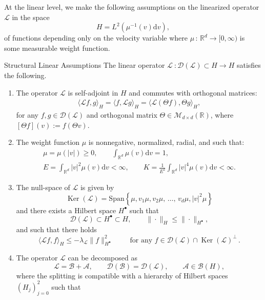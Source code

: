 \documentclass[10pt]{amsart}
\theoremstyle{definition}\newtheorem{defi}[theo]{Definition}\newtheorem{rema}[theo]{Remark}\newtheorem{exam}[theo]{Example}\newtheorem{exem}[theo]{Example}\newtheorem{nota}[theo]{Notation}
\DeclareMathOperator{\nul}{Ker}
\renewcommand{\d}{\mathrm{d}}
\newcommand{\rSpan}{\mathrm{Span}}
\newcommand{\R}{\mathbb{R}}
\renewcommand{\AA}{\mathcal{A}}
\newcommand{\BB}{\mathcal{B}}
\newcommand{\LL}{\mathcal{L}}
\newcommand{\dom}{\mathscr{D}}
\newcommand{\BBB}{\mathscr{B}}
\newcommand{\MMM}{\mathscr{M}}
\newcommand{\Ss}{H}
\newcommand{\Ssp}{H^{\bullet}}
\renewcommand*\le{\leqslant}
\renewcommand*\ge{\geqslant}
\newcommand{\la}{\langle}
\newcommand{\ra}{\rangle}
\newcommand*{\relabel}{\renewcommand{\labelenumi}{(\theenumi)}}
\newcommand*{\Lenumi}{\renewcommand*{\theenumi}{\textbf{L\arabic{enumi}}}\relabel}
\begin{document}
At the linear level, we make the following assumptions on the linearized operator $\LL$ in the space
\[
\Ss=L^{2}\left(\mu^{-1}(v)\d v\right),
\]
of functions depending only on the velocity variable where $\mu \, : \, \R^d \to [0,\infty)$ is some measurable weight function.

\begin{enonce}{Structural Linear Assumptions}\label{AsL1}
The linear operator $\LL\::\dom(\LL) \subset \Ss \to \Ss$ satisfies the following.
\begin{enumerate}\Lenumi
\item \label{L1}
The operator $\LL$ is self-adjoint in $\Ss$ and commutes with orthogonal matrices:
\begin{gather*}
\langle \LL f, g \rangle_{\Ss} = \langle f, \LL g \rangle_{\Ss} = \langle \LL ({\Theta}f), \Theta g \rangle_\Ss,
\end{gather*}
for any $f, g \in \dom(\LL)$ and orthogonal matrix $\Theta \in \MMM_{d \times d}(\R)$, where $[\Theta f](v):=f(\Theta v)$.
\item \label{L2}
The weight function $\mu$ is nonnegative, normalized, radial, and such that:
\begin{gather*}
\mu=\mu(|v|) \ge 0, \qquad \int_{\R^d} \mu(v) \d v = 1,\\
E = \int_{\R^d} |v|^2 \mu(v) \d v < \infty, \qquad K = \frac{1}{E^2} \int_{\R^d} | v |^4 \mu(v) \d v < \infty.
\end{gather*}
\item \label{L3}
The null-space of $\LL$ is given by
\begin{equation*}
\nul\left(\LL \right) =\rSpan\left\{ \mu, v_1 \mu, v_2 \mu, \,\dots,\,v_d \mu, |v|^2 \mu \right\}
\end{equation*}
and there exists a Hilbert space $\Ssp$ such that
\begin{equation*}
\dom(\LL) \subset \Ssp \subset \Ss, \qquad \| \cdot \|_{\Ss} \le \| \cdot \|_{\Ssp},
\end{equation*}
and such that there holds
\begin{equation*}
\la \LL f, f \ra_{\Ss} \le - \lambda_\LL \| f \|^2_{\Ssp} \qquad \text{ for any } f \in \dom(\LL) \cap \nul\left(\LL \right)^\perp\,.
\end{equation*}
\item \label{L4}
The operator $\LL$ can be decomposed as
\[
\LL = \BB+ \AA, \qquad \dom(\BB)=\dom(\LL), \qquad \AA \in \BBB(\Ss),
\]
where the splitting is compatible with a hierarchy of Hilbert spaces $(\Ss_j)_{j=0}^{2}$ such that

\end{enumerate}
\end{enonce}
\end{document}
